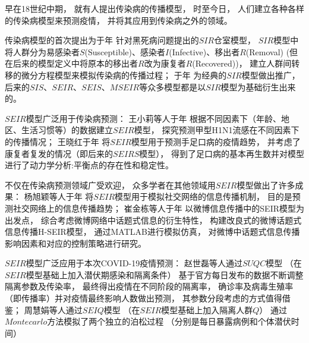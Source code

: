 \par 早在18世纪中期，
就有人提出传染病的传播模型，
时至今日，
人们建立各种各样的传染病模型来预测疫情，
并将其应用到传染病之外的领域。
\par 传染病模型的首次提出为\citeauthor{对流行病数学理论的贡献}于\citeyear{对流行病数学理论的贡献}年
针对黑死病问题提出的$SIR$仓室模型\cite{对流行病数学理论的贡献}，
$SIR$模型中将人群分为易感染者$S$(Susceptible)、感染者$I$(Infective)、移出者$R$(Removal)
(但在后来的模型定义中将原本的移出者$R$改为康复者$R$(Recovered))，
建立人群间转移的微分方程模型来模拟传染病的传播过程；
\citeauthor{Kermack-McKendrick确定性流行病模型的推广}于\citeyear{Kermack-McKendrick确定性流行病模型的推广}年
为经典的$SIR$模型做出推广\cite{Kermack-McKendrick确定性流行病模型的推广}，
后来的$SIS$、$SEIR$、$SEIS$、$MSEIR$等众多模型都是以$SIR$模型为基础衍生出来的。
\par $SEIR$模型广泛用于传染病预测：
王小莉等人于\citeyear{应用SEIR模型预测2009年甲型H1N1流感流行趋势}年
根据不同因素下（年龄、地区、生活习惯等）的数据建立$SEIR$模型，
探究预测甲型H1N1流感在不同因素下的传播情况\cite{应用SEIR模型预测2009年甲型H1N1流感流行趋势}；
王晓红于\citeyear{一类具有潜伏期的SEIR手足口病模型的研究}年
将$SEIR$模型用于预测手足口病的疫情趋势\cite{一类具有潜伏期的SEIR手足口病模型的研究}，
并考虑了康复者复发的情况（即后来的$SEIRS$模型），
得到了足口病的基本再生数并对模型进行了动力学分析:平衡点的存在性和稳定性。
\par 不仅在传染病预测领域广受欢迎，
众多学者在其他领域用$SEIR$模型做出了许多成果：
杨旭颖等人于\citeyear{基于SEIR的社交网络信息传播模型}年
将$SEIR$模型用于模拟社交网络的信息传播机制\cite{基于SEIR的社交网络信息传播模型}，
目的是预测社交网络上的信息传播趋势；
崔金栋等人于\citeyear{基于改良SEIR模型的微博话题式信息传播研究}年
以微博信息传播中的SEIR模型为出发点，
综合考虑微博网络中话题式信息的衍生特性，
构建改良式的微博话题式信息传播H-SEIR模型\cite{基于改良SEIR模型的微博话题式信息传播研究}，
通过MATLAB进行模拟仿真，
对微博中话题式信息传播影响因素和对应的控制策略进行研究。
\par $SEIR$模型广泛应用于本次COVID-19疫情预测：
赵世磊等人通过$SUQC$模型\cite{通过流行病学建模表征传播和确定COVID-19的控制策略}
（在$SEIR$模型基础上加入潜伏期感染和隔离条件）
基于官方每日发布的数据不断调整隔离参数及传染率，
最终得出疫情在不同阶段的隔离率，
确诊率及病毒生殖率（即传播率）并对疫情最终影响人数做出预测，
其参数分段考虑的方式值得借鉴；
周慧娟等人通过$SEIQ$模型\cite{中国COVID-19爆发的流行动力学模型和控制}
（在$SEIR$模型基础上加入隔离人群$Q$）
通过$Montecarlo$方法模拟了两个独立的泊松过程
（分别是每日暴露病例和个体潜伏时间）
